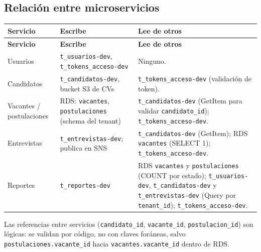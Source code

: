 \subsection{Relación entre microservicios}
\begin{longtable}{p{2.8cm}p{4.6cm}p{6.6cm}}
\toprule
\textbf{Servicio} & \textbf{Escribe} & \textbf{Lee de otros} \\
\midrule
\endfirsthead
\toprule
\textbf{Servicio} & \textbf{Escribe} & \textbf{Lee de otros} \\
\midrule
\endhead
\bottomrule
\endlastfoot
Usuarios & \texttt{t\_\allowbreak{}usuarios-\allowbreak{}dev}, \texttt{t\_\allowbreak{}tokens\_\allowbreak{}acceso-\allowbreak{}dev} & Ninguno. \\
Candidatos & \texttt{t\_\allowbreak{}candidatos-\allowbreak{}dev}, bucket S3 de CVs & \texttt{t\_\allowbreak{}tokens\_\allowbreak{}acceso-\allowbreak{}dev} (validación de token). \\
Vacantes / postulaciones & RDS: \texttt{vacantes}, \texttt{postulaciones} (schema del tenant) & \texttt{t\_\allowbreak{}candidatos-\allowbreak{}dev} (GetItem para validar \texttt{candidato\_\allowbreak{}id}); \texttt{t\_\allowbreak{}tokens\_\allowbreak{}acceso-\allowbreak{}dev}. \\
Entrevistas & \texttt{t\_\allowbreak{}entrevistas-\allowbreak{}dev}; publica en SNS & \texttt{t\_\allowbreak{}candidatos-\allowbreak{}dev} (GetItem); RDS \texttt{vacantes} (SELECT 1); \texttt{t\_\allowbreak{}tokens\_\allowbreak{}acceso-\allowbreak{}dev}. \\
Reportes & \texttt{t\_\allowbreak{}reportes-\allowbreak{}dev} & RDS \texttt{vacantes} y \texttt{postulaciones} (COUNT por estado); \texttt{t\_\allowbreak{}usuarios-\allowbreak{}dev}, \texttt{t\_\allowbreak{}candidatos-\allowbreak{}dev} y \texttt{t\_\allowbreak{}entrevistas-\allowbreak{}dev} (Query por \texttt{tenant\_\allowbreak{}id}); \texttt{t\_\allowbreak{}tokens\_\allowbreak{}acceso-\allowbreak{}dev}. \\
\end{longtable}

Las referencias entre servicios (\texttt{candidato\_\allowbreak{}id}, \texttt{vacante\_\allowbreak{}id}, \texttt{postulacion\_\allowbreak{}id}) son lógicas: se validan por código, no con claves foráneas, salvo \texttt{postulaciones.vacante\_\allowbreak{}id} hacia \texttt{vacantes.vacante\_\allowbreak{}id} dentro de RDS.
